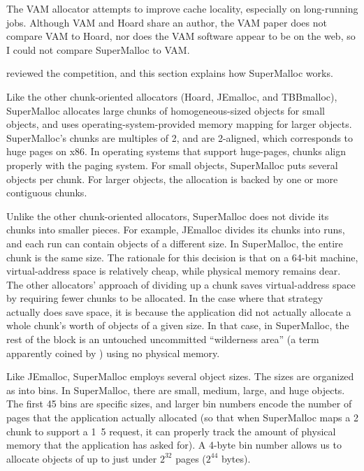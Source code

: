 \documentclass[natbib,sort&compress]{sigplanconf}
\begin{document}
The VAM allocator \cite{FengBe05} attempts to improve cache locality,
especially on long-running jobs.  Although VAM and Hoard share an
author, the VAM paper does not compare VAM to Hoard, nor does the VAM
software appear to be on the web, so I could not compare SuperMalloc
to VAM\@.


 reviewed the competition, and this section explains how
SuperMalloc works.   

Like the other chunk-oriented allocators (Hoard, JEmalloc, and
TBBmalloc), SuperMalloc allocates large chunks of homogeneous-sized
objects for small objects, and uses operating-system-provided memory
mapping for larger objects.  SuperMalloc's chunks are multiples of
\unit{2}\mebi\byte, and are \unit{2}\mebi\byte{}-aligned, which
corresponds to huge pages on x86.  In operating systems that support
huge-pages, chunks align properly with the paging system.  For small
objects, SuperMalloc puts several objects per chunk.  For larger
objects, the allocation is backed by one or more contiguous chunks.

Unlike the other chunk-oriented allocators, SuperMalloc does not
divide its chunks into smaller pieces.  For example, JEmalloc divides
its chunks into runs, and each run can contain objects of a different
size.  In SuperMalloc, the entire chunk is the same size.  The
rationale for this decision is that on a 64-bit machine,
virtual-address space is relatively cheap, while physical memory
remains dear.  The other allocators' approach of dividing up a chunk
saves virtual-address space by requiring fewer chunks to be allocated.
In the case where that strategy actually does save space, it is
because the application did not actually allocate a whole chunk's
worth of objects of a given size.  In that case, in SuperMalloc, the
rest of the block is an untouched uncommitted ``wilderness area'' (a
term apparently coined by \cite{KornVo85}) using no physical memory.



Like JEmalloc, SuperMalloc employs several object sizes.  The sizes
are organized as into bins.  In SuperMalloc, there are small, medium,
large, and huge objects.  The first 45 bins are specific sizes, and
larger bin numbers encode the number of pages that the application
actually allocated (so that when SuperMalloc maps a
\unit{2}\mebi\byte{} chunk to support a \unit{1.5}\mebi\byte{}
request, it can properly track the amount of physical memory that the
application has asked for).  A 4-byte bin number allows us to allocate
objects of up to just under $2^{32}$ pages ($2^{44}$ bytes).
\end{document}
